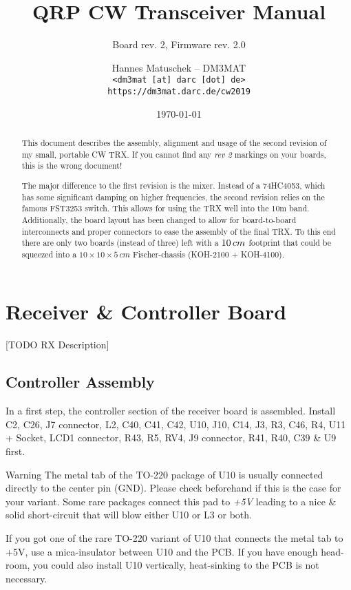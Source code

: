 \documentclass[10pt, a4paper]{scrartcl}
\title{QRP CW Transceiver Manual}
\subtitle{Board rev. 2, Firmware rev. 2.0}
\author{Hannes Matuschek -- DM3MAT\\\texttt{<dm3mat [at] darc [dot] de>}\\\texttt{https://dm3mat.darc.de/cw2019}}
\date{\today}
\newenvironment{warning}{\begin{bclogo}[couleur=red!30,arrondi=.1,logo=\bcattention,ombre=true]{Warning}}{\end{bclogo}}
\begin{document}
\maketitle

\begin{abstract}
This document describes the assembly, alignment and usage of the second revision of my small, portable CW TRX. If you cannot find any \emph{rev 2} markings on your boards, this is the wrong document!

The major difference to the first revision is the mixer. Instead of a 74HC4053, which has some significant damping on higher frequencies, the second revision relies on the famous FST3253 switch. This allows for using the TRX well into the 10m band. Additionally, the board layout has been changed to allow for board-to-board interconnects and proper connectors to ease the assembly of the final TRX. To this end there are only two boards (instead of three) left with a $10\time 8\,cm$ footprint that could be squeezed into a $10 \times 10\times 5\,cm$ Fischer-chassis (KOH-2100 + KOH-4100). 
\end{abstract}
\thispagestyle{empty}


\pagebreak
\tableofcontents
\thispagestyle{empty}

\clearpage
\section{Receiver \& Controller Board} \label{sec:rx}
 [TODO RX Description]

\subsection{Controller Assembly}
 In a first step, the controller section of the receiver board is assembled. Install C2, C26, J7 connector, L2, C40, C41, C42, U10, J10, C14, J3, R3, C46, R4, U11 + Socket, LCD1 connector, R43, R5, RV4, J9 connector, R41, R40, C39 \& U9 first. 

\begin{warning}
The metal tab of the TO-220 package of U10 is usually connected directly to the center pin (GND). Please check beforehand if this is the case for your variant. Some rare packages connect this pad to \emph{+5V} leading to a nice \& solid short-circuit that will blow either U10 or L3 or both.
\end{warning}

If you got one of the rare TO-220 variant of U10 that connects the metal tab to +5V, use a mica-insulator between U10 and the PCB. If you have enough head-room, you could also install U10 vertically, heat-sinking to the PCB is not necessary.
\end{document}
